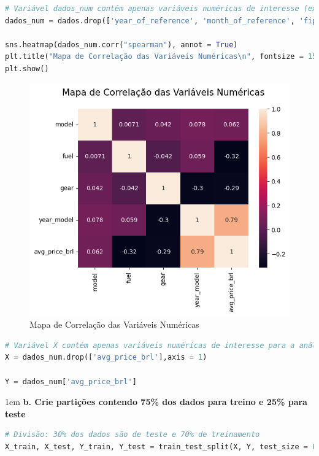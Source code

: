 \begin{lstlisting}[language=Python, style=input]
# Variável dados_num contém apenas variáveis numéricas de interesse (exclui o restante)
dados_num = dados.drop(['year_of_reference', 'month_of_reference', 'fipe_code', 'authentication', 'brand', 'engine_size'],axis = 1)

sns.heatmap(dados_num.corr("spearman"), annot = True)
plt.title("Mapa de Correlação das Variáveis Numéricas\n", fontsize = 15)
plt.show()
\end{lstlisting}
\begin{figure}[H]
\centering
\includegraphics[width=.8\linewidth]{apendices/fig/2_IAA002_7.png}
\caption{Mapa de Correlação das Variáveis Numéricas}
\end{figure}
\begin{lstlisting}[language=Python, style=input]
# Variável X contém apenas variáveis numéricas de interesse para a análise, excluindo a variável target 
X = dados_num.drop(['avg_price_brl'],axis = 1)

Y = dados_num['avg_price_brl']
\end{lstlisting}


\begin{adjustwidth}{1em}{}
\textbf{b. Crie partições contendo 75\% dos dados para treino e 25\% para teste}
\end{adjustwidth}
\begin{lstlisting}[language=Python, style=input]
# Divisão: 30% dos dados são de teste e 70% de treinamento
X_train, X_test, Y_train, Y_test = train_test_split(X, Y, test_size = 0.25, random_state = 42)
\end{lstlisting}

